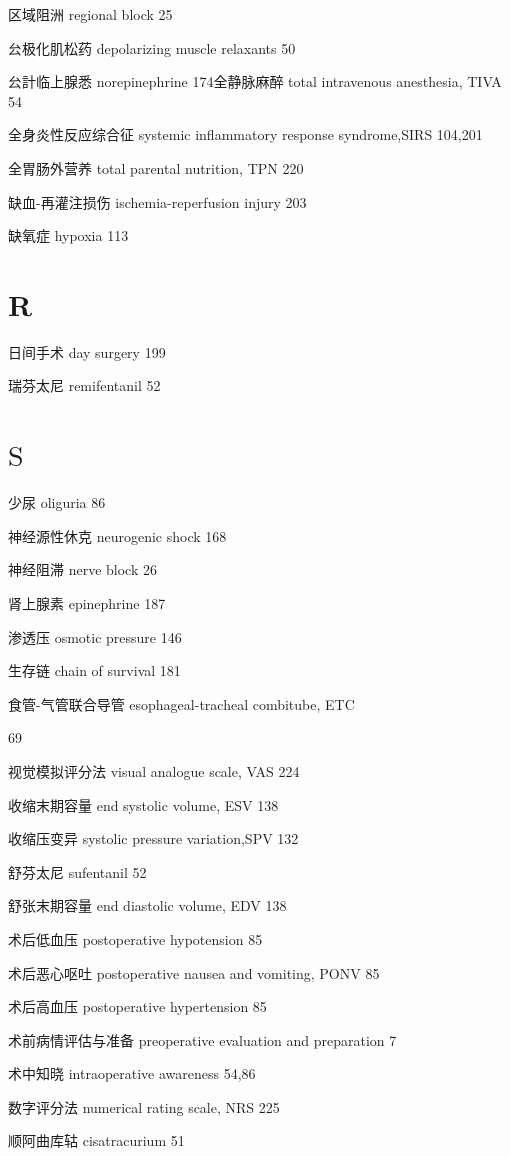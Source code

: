 \documentclass[10pt]{article}
\begin{document}
区域阻洲 regional block 25

㕕极化肌松药 depolarizing muscle relaxants 50

㕕計临上腺悉 norepinephrine 174全静脉麻醉 total intravenous anesthesia, TIVA 54

全身炎性反应综合征 systemic inflammatory response syndrome,SIRS 104,201

全胃肠外营养 total parental nutrition, TPN 220

缺血-再灌注损伤 ischemia-reperfusion injury 203

缺氧症 hypoxia 113

\section*{R}
日间手术 day surgery 199

瑞芬太尼 remifentanil 52

\section*{$\mathrm{S}$}
少尿 oliguria 86

神经源性休克 neurogenic shock 168

神经阻滞 nerve block 26

肾上腺素 epinephrine 187

渗透压 osmotic pressure 146

生存链 chain of survival 181

食管-气管联合导管 esophageal-tracheal combitube, ETC

69

视觉模拟评分法 visual analogue scale, VAS 224

收缩末期容量 end systolic volume, ESV 138

收缩压变异 systolic pressure variation,SPV 132

舒芬太尼 sufentanil 52

舒张末期容量 end diastolic volume, EDV 138

术后低血压 postoperative hypotension 85

术后恶心呕吐 postoperative nausea and vomiting, PONV 85

术后高血压 postoperative hypertension 85

术前病情评估与准备 preoperative evaluation and preparation 7

术中知晓 intraoperative awareness 54,86

数字评分法 numerical rating scale, NRS 225

顺阿曲库轱 cisatracurium 51
\end{document}
